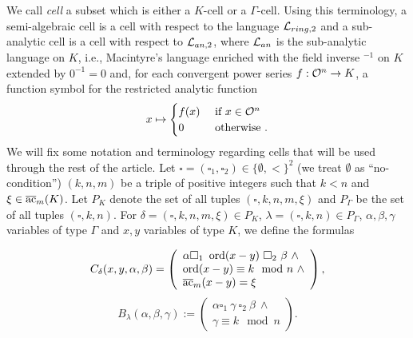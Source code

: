 We call \emph{cell} a subset which is either a $K$-cell or a $\Gamma$-cell. Using this terminology, a semi-algebraic cell is a cell with respect to the language ${\mathcal L}_{ring,2}$ and a sub-analytic cell is a cell with respect to ${\mathcal L}_{an,2}$, where ${\mathcal L}_{an}$ is the sub-analytic language on $K$, i.e., Macintyre's language enriched with the field inverse $^{-1}$ on $K$ extended by $0^{-1}=0$ and, for each convergent power series $f: {\mathcal O}^n
\to K$, a function symbol for the
restricted analytic function
\[x \mapsto 
\begin{cases}
f(x) &\text{ if }x \in {\mathcal O}^n\\
0 &\text{ otherwise }.
\end{cases}\]
We will fix some notation and terminology regarding cells that will be used through the rest of the article. Let $\square = (\square_1, \square_2) \in \{\emptyset, <\}^{2}$ (we treat $\emptyset$ as ``no-condition'') $(k,n,m)$ be a triple of positive integers such that $k<n$ and $\xi\in {\overline{\rm ac}}_{m}(K)$. Let $P_K$ denote the set of all tuples $(\square,k,n,m,\xi)$ and $P_\Gamma$ be the set of all tuples $(\square,k,n)$. For $\delta=(\square,k,n,m,\xi)\in P_K$, $\lambda=(\square,k,n)\in P_{\Gamma}$, $\alpha,\beta,\gamma$ variables of type $\Gamma$ and $x,y$ variables of type $K$, we define the formulas
\iffalse
\begin{align}\label{defcells}
\begin{split}
C_{1,\delta}(x,y,\alpha,\beta)&:= (\alpha\square_{1}\ \ord(x -y)\\square_{2}\ \beta)\\
C_{2,\delta}(x,y)&:= ({\ord(x-y)\equiv k \ \text{mod } n})\\
C_{3,\delta}(x,y)&:= (\ac_{m}(x-y)=\xi)\\
C_\delta(x,y,\alpha,\beta)&:=C_{1,\delta}(x,y,\alpha,\beta)\wedge C_{2,\delta}(x,y)\wedge C_{3,\delta}(x,y)\\
\\
B_{1,\lambda}(\alpha,\beta,\gamma)&:= (\alpha\square_{1} \gamma \ \square_{2}\ \beta)\\
B_{2,\lambda}(\gamma)&:= ({\gamma\equiv k \ \text{mod } n})\\
B_{\lambda}(\alpha,\beta,\gamma)&:=B_{1,\lambda}(\alpha,\beta,\gamma)\wedge B_{\lambda}(\gamma).
\end{split}
\end{align}
\fi

\begin{equation}\label{defKcells}
C_\delta(x,y,\alpha,\beta) = \left(\begin{array}{l} \alpha \square_1 \ \ord(x-y) \ \square_2 \ \beta \ \wedge\\ \ord(x-y) \equiv k\mod n \ \wedge\\ \ac_{m}(x-y) = \xi \end{array} \right),
\end{equation}
\begin{equation}\label{defGammacells}
B_\lambda(\alpha,\beta,\gamma):= \left(\begin{array}{l} \alpha \square_1 \ \gamma \ \square_2 \ \beta \ \wedge \\
\gamma \equiv k\mod n \end{array}\right).
\end{equation}

